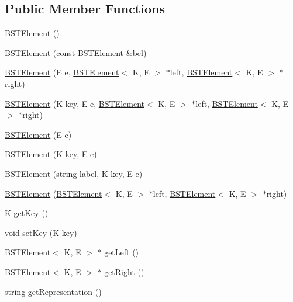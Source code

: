 \subsection*{Public Member Functions}
\begin{DoxyCompactItemize}
\item 
\hyperlink{classbridges_1_1_b_s_t_element_a6bc4007042470785ca865c900bfbf20e}{B\+S\+T\+Element} ()
\item 
\hyperlink{classbridges_1_1_b_s_t_element_a0cb40809388f5191f3fc5f20c94e5cdd}{B\+S\+T\+Element} (const \hyperlink{classbridges_1_1_b_s_t_element}{B\+S\+T\+Element} \&bel)
\item 
\hyperlink{classbridges_1_1_b_s_t_element_ae9b41bdf1b056f450659735d51c3f459}{B\+S\+T\+Element} (E e, \hyperlink{classbridges_1_1_b_s_t_element}{B\+S\+T\+Element}$<$ K, E $>$ $\ast$left, \hyperlink{classbridges_1_1_b_s_t_element}{B\+S\+T\+Element}$<$ K, E $>$ $\ast$right)
\item 
\hyperlink{classbridges_1_1_b_s_t_element_ac491df9b8a9d2cf45a7a9f8f4f4e1857}{B\+S\+T\+Element} (K key, E e, \hyperlink{classbridges_1_1_b_s_t_element}{B\+S\+T\+Element}$<$ K, E $>$ $\ast$left, \hyperlink{classbridges_1_1_b_s_t_element}{B\+S\+T\+Element}$<$ K, E $>$ $\ast$right)
\item 
\hyperlink{classbridges_1_1_b_s_t_element_a19f2e875a88cf31fbbdfe37f316e5ee7}{B\+S\+T\+Element} (E e)
\item 
\hyperlink{classbridges_1_1_b_s_t_element_a7f839a433a77348edf2927a8ec86faf2}{B\+S\+T\+Element} (K key, E e)
\item 
\hyperlink{classbridges_1_1_b_s_t_element_abe6e9d2aa04a01cbcdd733067170b175}{B\+S\+T\+Element} (string label, K key, E e)
\item 
\hyperlink{classbridges_1_1_b_s_t_element_a43719ed15f0be72ef2977c829f7e770d}{B\+S\+T\+Element} (\hyperlink{classbridges_1_1_b_s_t_element}{B\+S\+T\+Element}$<$ K, E $>$ $\ast$left, \hyperlink{classbridges_1_1_b_s_t_element}{B\+S\+T\+Element}$<$ K, E $>$ $\ast$right)
\item 
K \hyperlink{classbridges_1_1_b_s_t_element_a89ce2cbf35d533d95ea89c14806f75f9}{get\+Key} ()
\item 
void \hyperlink{classbridges_1_1_b_s_t_element_a6d9008eaaf94d17b3376f419b964d6d0}{set\+Key} (K key)
\item 
\hyperlink{classbridges_1_1_b_s_t_element}{B\+S\+T\+Element}$<$ K, E $>$ $\ast$ \hyperlink{classbridges_1_1_b_s_t_element_aed62cfb1cc9c4954c19232193b8ec3bf}{get\+Left} ()
\item 
\hyperlink{classbridges_1_1_b_s_t_element}{B\+S\+T\+Element}$<$ K, E $>$ $\ast$ \hyperlink{classbridges_1_1_b_s_t_element_a6b1ef2135ded7cfdde9b4ac7c634a642}{get\+Right} ()
\item 
string \hyperlink{classbridges_1_1_b_s_t_element_a3c21670f445b662552bc3907a2ed51fd}{get\+Representation} ()
\end{DoxyCompactItemize}


